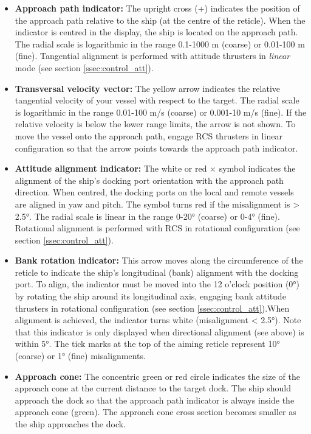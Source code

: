 \documentclass[Orbiter User Manual.tex]{subfiles}
\begin{document}
\begin{itemize}
\item \textbf{Approach path indicator:} The upright cross (+) indicates the position of the approach path relative to the ship (at the centre of the reticle). When the indicator is centred in the display, the ship is located on the approach path. The radial scale is logarithmic in the range 0.1-1000 m (coarse) or 0.01-100 m (fine). Tangential alignment is performed with attitude thrusters in \textit{linear} mode (see section \ref{ssec:control_att}).
\item \textbf{Transversal velocity vector:} The yellow arrow indicates the relative tangential velocity of your vessel with respect to the target. The radial scale is logarithmic in the range 0.01-100 m/s (coarse) or 0.001-10 m/s (fine). If the relative velocity is below the lower range limits, the arrow is not shown. To move the vessel onto the approach path, engage RCS thrusters in linear configuration so that the arrow points towards the approach path indicator.
\item \textbf{Attitude alignment indicator:} The white or red $\times$ symbol indicates the alignment of the ship's docking port orientation with the approach path direction. When centred, the docking ports on the local and remote vessels are aligned in yaw and pitch. The symbol turns red if the misalignment is > 2.5°. The radial scale is linear in the range 0-20° (coarse) or 0-4° (fine). Rotational alignment is performed with RCS in rotational configuration (see section \ref{ssec:control_att}).
\item \textbf{Bank rotation indicator:} This arrow moves along the circumference of the reticle to indicate the ship's longitudinal (bank) alignment with the docking port. To align, the indicator must be moved into the 12 o'clock position (0°) by rotating the ship around its longitudinal axis, engaging bank attitude thrusters in rotational configuration (see section \ref{ssec:control_att}).When alignment is achieved, the indicator turns white (misalignment < 2.5°). Note that this indicator is only displayed when directional alignment (see above) is within 5°. The tick marks at the top of the aiming reticle represent 10° (coarse) or 1° (fine) misalignments.
\item \textbf{Approach cone:} The concentric green or red circle indicates the size of the approach cone at the current distance to the target dock. The ship should approach the dock so that the approach path indicator is always inside the approach cone (green). The approach cone cross section becomes smaller as the ship approaches the dock.
\end{itemize}
\end{document}

